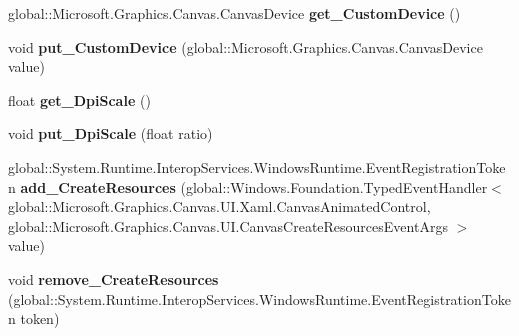 \begin{DoxyCompactItemize}
global\+::\+Microsoft.\+Graphics.\+Canvas.\+Canvas\+Device {\bfseries get\+\_\+\+Custom\+Device} ()
\item 
\mbox{\label{interface_microsoft_1_1_graphics_1_1_canvas_1_1_u_i_1_1_xaml_1_1_i_canvas_animated_control_a1ed79cdec8e4db44f9bde6eea87fac53}} 
void {\bfseries put\+\_\+\+Custom\+Device} (global\+::\+Microsoft.\+Graphics.\+Canvas.\+Canvas\+Device value)
\item 
\mbox{\label{interface_microsoft_1_1_graphics_1_1_canvas_1_1_u_i_1_1_xaml_1_1_i_canvas_animated_control_a8e858555a2d0715c9b9885272b85946f}} 
float {\bfseries get\+\_\+\+Dpi\+Scale} ()
\item 
\mbox{\label{interface_microsoft_1_1_graphics_1_1_canvas_1_1_u_i_1_1_xaml_1_1_i_canvas_animated_control_a3434abed58869d5f025b85596f8a92a0}} 
void {\bfseries put\+\_\+\+Dpi\+Scale} (float ratio)
\item 
\mbox{\label{interface_microsoft_1_1_graphics_1_1_canvas_1_1_u_i_1_1_xaml_1_1_i_canvas_animated_control_af05296a1a18229faaeee054fa63665aa}} 
global\+::\+System.\+Runtime.\+Interop\+Services.\+Windows\+Runtime.\+Event\+Registration\+Token {\bfseries add\+\_\+\+Create\+Resources} (global\+::\+Windows.\+Foundation.\+Typed\+Event\+Handler$<$ global\+::\+Microsoft.\+Graphics.\+Canvas.\+U\+I.\+Xaml.\+Canvas\+Animated\+Control, global\+::\+Microsoft.\+Graphics.\+Canvas.\+U\+I.\+Canvas\+Create\+Resources\+Event\+Args $>$ value)
\item 
\mbox{\label{interface_microsoft_1_1_graphics_1_1_canvas_1_1_u_i_1_1_xaml_1_1_i_canvas_animated_control_a4911c1a0849c77431433f7738b46dda9}} 
void {\bfseries remove\+\_\+\+Create\+Resources} (global\+::\+System.\+Runtime.\+Interop\+Services.\+Windows\+Runtime.\+Event\+Registration\+Token token)
\item 
\mbox{\label{interface_microsoft_1_1_graphics_1_1_canvas_1_1_u_i_1_1_xaml_1_1_i_canvas_animated_control_aee65ebdd3be32b82bf4a1554f8c2b8c6}} 

\end{DoxyCompactItemize}
